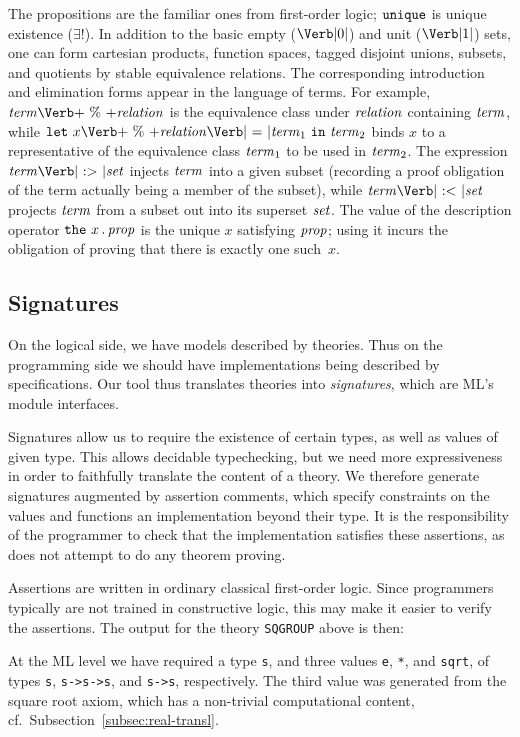 The propositions are the familiar ones from first-order logic;
$\mbox{\texttt{unique}}$ is unique existence ($\exists!$). In addition to the basic
empty ($\ZERO$) and unit ($\ONE$) sets, one can form cartesian
products, function spaces, tagged disjoint unions, subsets, and
quotients by stable equivalence relations. The corresponding
introduction and elimination forms appear in the language of terms.
For example, $\Term \PERCENT \metav{relation}$ is the equivalence
class under $\mbox{\textit{relation}}$ containing $\mbox{\textit{term}}$, while $\LET\ x
\PERCENT \metav{relation} \mbox{\Verb| = |} \Term_1\ \IN\ \Term_2$
binds $x$ to a representative of the equivalence class $\mbox{\textit{term}}_1$ to be
used in $\mbox{\textit{term}}_2$. The expression $\Term \SUBIN \Set$ injects $\mbox{\textit{term}}$
into a given subset (recording a proof obligation of the term actually
being a member of the subset), while $\Term \SUBOUT \Set$ projects
$\mbox{\textit{term}}$ from a subset out into its superset $\mbox{\textit{set}}$. The value of the
description operator $\mbox{\texttt{the}}\ x \,.\, \mbox{\textit{prop}}$ is the unique $x$
satisfying $\mbox{\textit{prop}}$; using it incurs the obligation of proving that
there is exactly one such~$x$.


\subsection{Signatures}
\label{sec:signatures}

On the logical side, we have models described by theories.  Thus on
the programming side we should have implementations being described by
specifications.  Our tool thus translates theories into
\emph{signatures}, which are ML's module interfaces.

Signatures allow us to require the existence of certain types, as well
as values of given type.  This allows decidable typechecking, but we
need more expressiveness in order to faithfully translate the content
of a theory.  We therefore generate signatures augmented by assertion
comments, which specify constraints on the values and functions an
implementation beyond their type.  It is the responsibility of the
programmer to check that the implementation satisfies these
assertions, as \RZ does not attempt to do any theorem proving.

Assertions are written in ordinary classical first-order logic. Since
programmers typically are not trained in constructive logic, this may
make it easier to verify the assertions.
\goodbreak
The output for the theory \Verb|SQGROUP| above is then:
{\small {}}

At the ML level we have required a type \Verb|s|, and three values
\Verb|e|, \Verb|*|, and \Verb|sqrt|, of types \Verb|s|,
\Verb|s->s->s|, and \Verb|s->s|, respectively. The third value was
generated from the square root axiom, which has a non-trivial
computational content, cf.\ Subsection~\ref{subsec:real-transl}.

